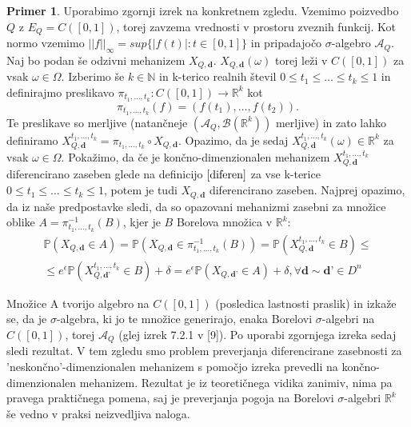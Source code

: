 \documentclass[12pt,a4paper]{amsart}
\theoremstyle{definition} %
\newtheorem{primer}[definicija]{Primer}
\theoremstyle{plain} %
\begin{document}
\begin{primer}
Uporabimo zgornji izrek na konkretnem zgledu. Vzemimo poizvedbo $Q$ z $E_Q = C([0,1])$, torej zavzema vrednosti v prostoru zveznih funkcij. Kot normo vzemimo $||f||_\infty = sup\{|f(t)| : t \in [0,1]\}$ in pripadajočo $\sigma$-algebro $\mathcal{A}_Q$. Naj bo podan še odzivni mehanizem $X_{Q,\textbf{d}}$. $X_{Q,\textbf{d}}(\omega)$ torej leži v $C([0,1])$ za vsak $\omega \in \Omega$.
\newline
Izberimo še $k \in \mathbb{N}$ in k-terico realnih števil $0 \leq t_1 \leq \ldots \leq t_k \leq 1$ in definirajmo preslikavo $ \pi _{t_1,\ldots,t_k}: C([0,1]) \rightarrow \mathbb{R}^k$ kot $$\pi _{t_1,\ldots,t_k}(f) = (f(t_1),\ldots,f(t_2)).$$ Te preslikave so merljive (natančneje $(\mathcal{A}_Q, \mathcal{B}(\mathbb{R}^k))$ merljive) in zato lahko definiramo $X_{Q,\textbf{d}}^{t_1,\ldots,t_k} = \pi _{t_1,\ldots,t_k} \circ X_{Q,\textbf{d}}$. Opazimo, da je sedaj $X_{Q,\textbf{d}}^{t_1,\ldots,t_k} (\omega) \in \mathbb{R}^k$ za vsak $\omega \in \Omega$. Pokažimo, da če je končno-dimenzionalen mehanizem $X_{Q,\textbf{d}}^{t_1,\ldots,t_k}$ diferencirano zaseben glede na definicijo $\eqref{diferen}$ za vse k-terice $0 \leq t_1 \leq \ldots \leq t_k \leq 1$, potem je tudi $X_{Q,\textbf{d}}$ diferencirano zaseben. Najprej opazimo, da iz naše predpostavke sledi, da so opazovani mehanizmi zasebni za množice oblike $A = \pi _{t_1,\ldots,t_k}^{-1}(B)$, kjer je $B$ Borelova množica v $\mathbb{R}^k$: 
\begin{gather*}
\mathbb{P}(X_{Q,\textbf{d}} \in A) =  \mathbb{P}(X_{Q,\textbf{d}} \in \pi _{t_1,\ldots,t_k}^{-1}(B)) = \mathbb{P}(X_{Q,\textbf{d}}^{t_1,\ldots,t_k} \in B) \leq \\
 \leq e^{\epsilon}\mathbb{P}(X_{Q,\textbf{d'}}^{t_1,\ldots,t_k} \in B) + \delta = e^{\epsilon}\mathbb{P}(X_{Q,\textbf{d'}} \in A) + \delta, \forall \textbf{d} \sim \textbf{d'} \in D^n
\end{gather*}


Množice A tvorijo algebro na $C([0,1])$ (posledica lastnosti praslik) in izkaže se, da je $\sigma$-algebra, ki jo te množice generirajo, enaka  Borelovi $\sigma$-algebri na $C([0,1])$, torej $\mathcal{A}_Q$ (glej izrek 7.2.1 v [9]). Po uporabi zgornjega izreka sedaj sledi rezultat.
\newline
\newline
V tem zgledu smo problem preverjanja diferencirane zasebnosti za 'neskončno'-dimenzionalen mehanizem s pomočjo izreka prevedli na končno-dimenzionalen mehanizem. Rezultat je iz teoretičnega vidika zanimiv, nima pa pravega praktičnega pomena, saj je preverjanja pogoja na Borelovi $\sigma$-algebri $\mathbb{R}^k$ še vedno v praksi neizvedljiva naloga.
\end{primer}
\end{document}
